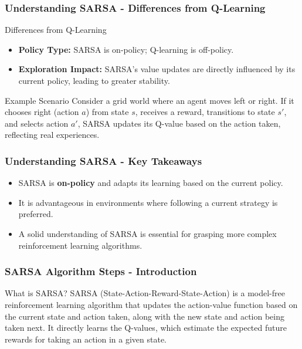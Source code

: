 \documentclass{beamer}
\begin{document}
\begin{frame}[fragile]
    \frametitle{Understanding SARSA - Differences from Q-Learning}
    
    \begin{block}{Differences from Q-Learning}
        \begin{itemize}
            \item \textbf{Policy Type:} SARSA is on-policy; Q-learning is off-policy.
            \item \textbf{Exploration Impact:} SARSA's value updates are directly influenced by its current policy, leading to greater stability.
        \end{itemize}
    \end{block}

    \begin{block}{Example Scenario}
        Consider a grid world where an agent moves left or right. If it chooses right (action \( a \)) from state \( s \), receives a reward, transitions to state \( s' \), and selects action \( a' \), SARSA updates its Q-value based on the action taken, reflecting real experiences.
    \end{block}
\end{frame}

\begin{frame}[fragile]
    \frametitle{Understanding SARSA - Key Takeaways}
    
    \begin{itemize}
        \item SARSA is \textbf{on-policy} and adapts its learning based on the current policy.
        \item It is advantageous in environments where following a current strategy is preferred.
        \item A solid understanding of SARSA is essential for grasping more complex reinforcement learning algorithms.
    \end{itemize}
\end{frame}

\begin{frame}[fragile]
    \frametitle{SARSA Algorithm Steps - Introduction}
    \begin{block}{What is SARSA?}
        SARSA (State-Action-Reward-State-Action) is a model-free reinforcement learning algorithm that updates the action-value function based on the current state and action taken, along with the new state and action being taken next. 
        It directly learns the Q-values, which estimate the expected future rewards for taking an action in a given state.
    \end{block}
\end{frame}
\end{document}

